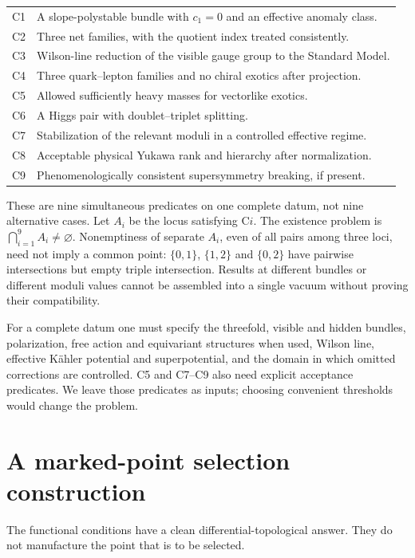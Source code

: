 \begin{center}\small
\begin{tabular}{@{}p{.07\linewidth}p{.85\linewidth}@{}}
\toprule
C1 & A slope-polystable bundle with $c_1=0$ and an effective anomaly class.\\
C2 & Three net families, with the quotient index treated consistently.\\
C3 & Wilson-line reduction of the visible gauge group to the Standard Model.\\
C4 & Three quark--lepton families and no chiral exotics after projection.\\
C5 & Allowed sufficiently heavy masses for vectorlike exotics.\\
C6 & A Higgs pair with doublet--triplet splitting.\\
C7 & Stabilization of the relevant moduli in a controlled effective regime.\\
C8 & Acceptable physical Yukawa rank and hierarchy after normalization.\\
C9 & Phenomenologically consistent supersymmetry breaking, if present.\\
\bottomrule
\end{tabular}
\end{center}

These are nine simultaneous predicates on one complete datum, not nine
alternative cases. Let $A_i$ be the locus satisfying C$i$. The existence
problem is $\bigcap_{i=1}^9 A_i\ne\varnothing$. Nonemptiness of separate
$A_i$, even of all pairs among three loci, need not imply a common point:
$\{0,1\}$, $\{1,2\}$ and $\{0,2\}$ have pairwise intersections but empty
triple intersection. Results at different bundles or different moduli
values cannot be assembled into a single vacuum without proving their
compatibility.

For a complete datum one must specify the threefold, visible and hidden
bundles, polarization, free action and equivariant structures when used,
Wilson line, effective K\"ahler potential and superpotential, and the
domain in which omitted corrections are controlled. C5 and C7--C9 also
need explicit acceptance predicates. We leave those predicates as inputs;
choosing convenient thresholds would change the problem.

\section{A marked-point selection construction}
The functional conditions have a clean differential-topological answer.
They do not manufacture the point that is to be selected.

